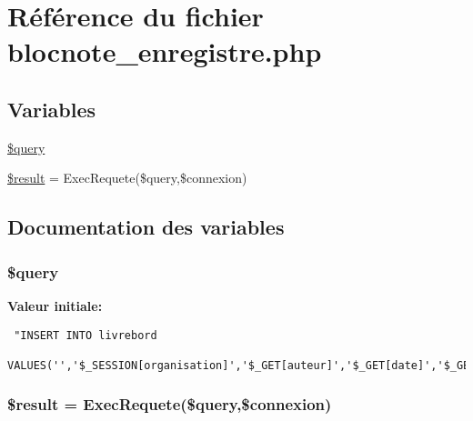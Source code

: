 \hypertarget{blocnote__enregistre_8php}{
\section{R\'{e}f\'{e}rence du fichier blocnote\_\-enregistre.php}
\label{blocnote__enregistre_8php}
}
\subsection*{Variables}
\begin{CompactItemize}
\item 
\hyperlink{blocnote__enregistre_8php_a0}{\$query}
\item 
\hyperlink{blocnote__enregistre_8php_a1}{\$result} = Exec\-Requete(\$query,\$connexion)
\end{CompactItemize}


\subsection{Documentation des variables}
\hypertarget{blocnote__enregistre_8php_a0}{
\subsubsection[\$query]{\setlength{\rightskip}{0pt plus 5cm}\$query}}
\label{blocnote__enregistre_8php_a0}


{\bf Valeur initiale:}

\footnotesize\begin{verbatim} "INSERT INTO livrebord
                        VALUES('','$_SESSION[organisation]','$_GET[auteur]','$_GET[date]','$_GET[montexte]')"
\end{verbatim}\normalsize 
\hypertarget{blocnote__enregistre_8php_a1}{
\subsubsection[\$result]{\setlength{\rightskip}{0pt plus 5cm}\$result = Exec\-Requete(\$query,\$connexion)}}
\label{blocnote__enregistre_8php_a1}


